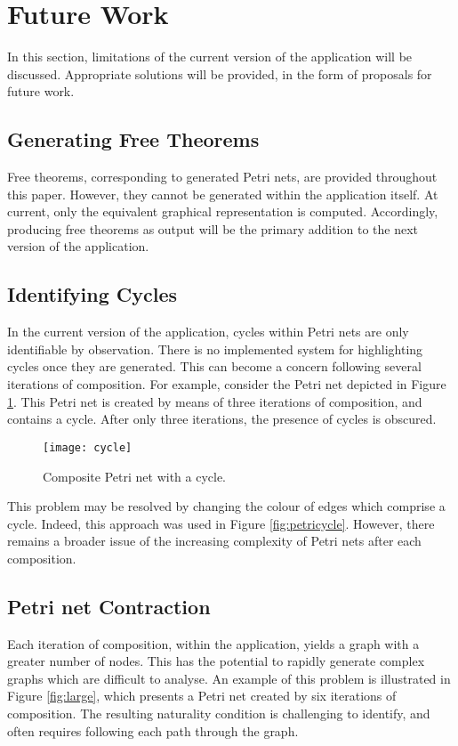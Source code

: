 \documentclass[../Dissertation.tex]{subfiles}
\begin{document}
\section{Future Work}
In this section, limitations of the current version of the application will be discussed. Appropriate solutions will be provided, in the form of proposals for future work.

\subsection{Generating Free Theorems}
Free theorems, corresponding to generated Petri nets, are provided throughout this paper. However, they cannot be generated within the application itself. At current, only the equivalent graphical representation is computed. Accordingly, producing free theorems as output will be the primary addition to the next version of the application.

\subsection{Identifying Cycles}
In the current version of the application, cycles within Petri nets are only identifiable by observation. There is no implemented system for highlighting cycles once they are generated. This can become a concern following several iterations of composition. For example, consider the Petri net depicted in Figure \ref{fig:cycle}. This Petri net is created by means of three iterations of composition, and contains a cycle. After only three iterations, the presence of cycles is obscured.

\begin{figure}[H]
\begin{center}
\texttt{[image: cycle]}
\end{center}
\caption{Composite Petri net with a cycle.}
\label{fig:cycle}
\end{figure}

This problem may be resolved by changing the colour of edges which comprise a cycle. Indeed, this approach was used in Figure \ref{fig:petricycle}. However, there remains a broader issue of the increasing complexity of Petri nets after each composition.

\subsection{Petri net Contraction}
Each iteration of composition, within the application, yields a graph with a greater number of nodes. This has the potential to rapidly generate complex graphs which are difficult to analyse. An example of this problem is illustrated in Figure \ref{fig:large}, which presents a Petri net created by six iterations of composition. The resulting naturality condition is challenging to identify, and often requires following each path through the graph.
\end{document}
